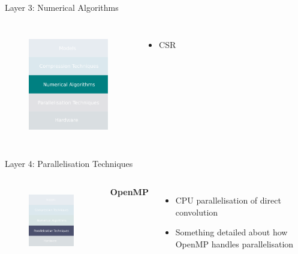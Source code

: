 \documentclass{beamer}
\begin{document}
\begin{frame}{Layer 3: Numerical Algorithms}

\begin{columns}


\begin{figure}
    \centering
    \includegraphics[width=3.5cm]{images/numericals.pdf}
    \label{fig:inference-stack-nums-2}
\end{figure}

\begin{itemize}
    \item CSR
\end{itemize}

\end{columns}
\end{frame}

\begin{frame}{Layer 4: Parallelisation Techniques}

\begin{columns}


\begin{figure}
    \centering
    \includegraphics[width=3.5cm]{images/parallelisations.pdf}
    \label{fig:inference-stack-parallels}
\end{figure}


\textbf{OpenMP}
\begin{itemize}
    \item CPU parallelisation of direct convolution 
    \item Something detailed about how OpenMP handles parallelisation
\end{itemize}

\end{columns}

\end{frame}
\end{document}
